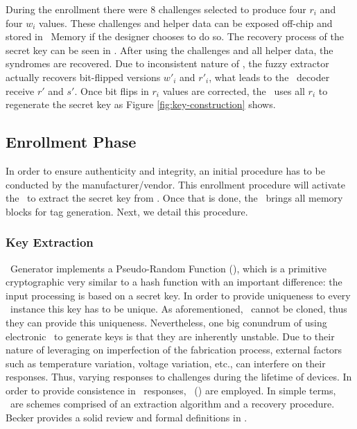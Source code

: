 During the enrollment there were 8 challenges selected to produce four $r_i$ and four $w_i$ values. These challenges and helper data can be exposed off-chip and stored in \ptag~Memory if the designer chooses to do so. The recovery process of the secret key can be seen in \fregen. After using the challenges and all helper data, the syndromes are recovered. Due to inconsistent nature of \pufs, the fuzzy extractor actually recovers bit-flipped versions $w'_i$ and $r'_i$, what leads to the \bch~decoder receive $r'$ and $s'$. Once bit flips in $r_i$ values are corrected, the \fe~uses all $r_i$ to regenerate the secret key as Figure \ref{fig:key-construction} shows.

\subsection{Enrollment Phase}
\label{subsec:Enrollment-Phase}

In order to ensure authenticity and integrity, an initial procedure has to be conducted by the manufacturer\slash{}vendor. This enrollment procedure will activate the \fuzzy~to extract the secret key from \pufs. Once that is done, the \handler~brings all memory blocks for tag generation. Next, we detail this procedure.

\subsubsection{Key Extraction}
\label{subsubsec:Key-Extraction}

\ptag~Generator implements a Pseudo-Random Function (\prf), which is a primitive cryptographic very similar to a hash function with an important difference: the input processing is based on a secret key. In order to provide uniqueness to every \cshia~instance this key has to be unique. As aforementioned, \pufs~cannot be cloned, thus they can provide this uniqueness. Nevertheless, one big conundrum of using electronic \pufs~to generate keys is that they are inherently unstable. Due to their nature of leveraging on imperfection of the fabrication process, external factors such as temperature variation, voltage variation, etc., can interfere on their responses. Thus, varying responses to challenges during the lifetime of devices. In order to provide consistence in \puf~responses, \fuzzy~(\fe) are employed. In simple terms, \fes~are schemes comprised of an extraction algorithm and a recovery procedure. Becker provides a solid review and formal definitions in \cite{Becker2017:RobustFuzzyExtractor}.

